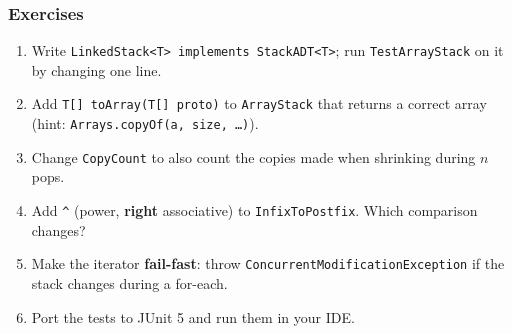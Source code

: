 \documentclass[aspectratio=169,10pt,compress]{beamer}
\begin{document}
\begin{frame}[t,fragile] \frametitle{Exercises}
  \begin{enumerate}\small
    \item Write \texttt{LinkedStack<T> implements StackADT<T>}; run \texttt{TestArrayStack} on it by changing one line.
    \item Add \texttt{T[] toArray(T[] proto)} to \texttt{ArrayStack} that returns a correct array (hint: \texttt{Arrays.copyOf(a, size, \dots)}).
    \item Change \texttt{CopyCount} to also count the copies made when shrinking during $n$ pops.
    \item Add \texttt{\textasciicircum} (power, \textbf{right} associative) to \texttt{InfixToPostfix}. Which comparison changes?
    \item Make the iterator \textbf{fail-fast}: throw \texttt{ConcurrentModificationException} if the stack changes during a for-each.
    \item Port the tests to JUnit 5 and run them in your IDE.
  \end{enumerate}
\end{frame}




\begin{frame}[t,fragile]
	\begin{center}
		\vspace{4cm}
	\end{center}
\end{frame}
\end{document}

